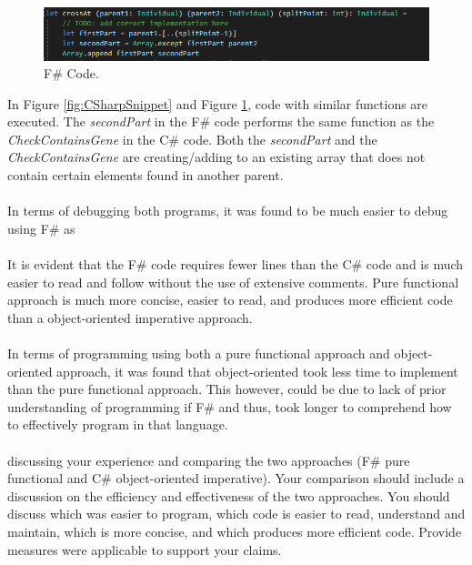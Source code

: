 \documentclass[a4paper]{article}
\begin{document}
\begin{figure}[H]
	\center
	\includegraphics[width=0.9\linewidth]{images/FSharpSnippet2.png}
	\caption{F\# Code.}
	\label{fig:FSharpSnippet2}
\end{figure}
In Figure \ref{fig:CSharpSnippet} and Figure \ref{fig:FSharpSnippet2}, code with similar functions are executed. The \textit{secondPart} in the F\# code performs the same function as the \textit{CheckContainsGene} in the C\# code. Both the \textit{secondPart} and the \textit{CheckContainsGene} are creating/adding to an existing array that does not contain certain elements found in another parent. 
\\\\
In terms of debugging both programs, it was found to be much easier to debug using F\# as 
\\\\
It is evident that the F\# code requires fewer lines than the C\# code and is much easier to read and follow without the use of extensive comments. Pure functional approach is much more concise, easier to read, and produces more efficient code than a object-oriented imperative approach.  
\\\\
In terms of programming using both a pure functional approach and object-oriented approach, it was found that object-oriented took less time to implement than the pure functional approach. This however, could be due to lack of prior understanding of programming if F\# and thus, took longer to comprehend how to effectively program in that language.
\\\\
discussing your experience and comparing the two approaches (F\# pure functional and C\# object-oriented imperative). Your comparison should include a discussion on the efficiency and effectiveness of the two approaches. You should discuss which was easier to program, which code is easier to read, understand and maintain, which is more concise, and which produces more efficient code. Provide measures were applicable to support your claims.
\end{document}
